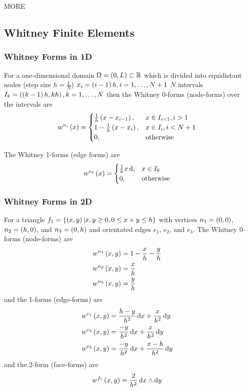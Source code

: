 MORE

\subsection{Whitney Finite Elements}

\subsubsection{Whitney Forms in 1D}

For a one-dimensional domain $\Omega=\pbrac{0,L}\subset\rntopology{}$ which is
divided into equidistant nodes (step size $h=\frac{L}{N}$)
$x_{i}=\left( i-1 \right)h, i=1,\ldots,N+1$ \ie $N$ intervals
$I_{k}=\left( \left( k-1 \right)h,kh \right), k=1,\ldots,N$ then the Whitney 0-forms
(node-forms) over the intervals are
\begin{equation}
   w^{n_{i}}\left( x \right)  = \begin{cases}
    \frac{1}{h}\left( x-x_{i-1} \right), & x\in I_{i=1}, i>1 \\
    1-\frac{1}{h}\left( x-x_{i} \right), & x\in I_{i},i<N+1 \\
    0, & \text{otherwise}
  \end{cases}
\end{equation}

The Whitney 1-forms (edge forms) are
\begin{equation}
   w^{e_{k}}\left( x \right)  = \begin{cases}
    \frac{1}{h} x\,  { \mathrm{d} },    & x\in I_{k} \\
    0, & \text{otherwise}
  \end{cases}
\end{equation}

\subsubsection{Whitney Forms in 2D}

For a triangle $f_{1}=\left\{ \left( x,y \right)\vert x,y\ge 0, 0\leq x+y \leq h \right\}$
with vertices $n_{1}=\left( 0,0 \right)$, $n_{2}=\left( h,0 \right)$, and
$n_{3}=\left( 0,h \right)$ and orientated edges $e_{1}$, $e_{2}$, and $e_{3}$. The
Whitney 0-forms (node-forms) are
\begin{align}
   w^{n_{1}}\left( x,y \right)  &= 1-\frac{x}{h}-\frac{y}{h} \\
   w^{n_{2}}\left( x,y \right)  &= \frac{x}{h} \\
   w^{n_{3}}\left( x,y \right)  &= \frac{y}{h}  
\end{align}
and the 1-forms (edge-forms) are
\begin{align}
   w^{e_{1}}\left( x,y \right) &= \frac{h-y}{h^{2}}\,  { \mathrm{d} }x   + \frac{x}{h^{2}}\,  { \mathrm{d} }y   \\
   w^{e_{2}}\left( x,y \right) &= \frac{-y}{h^{2}}\,  { \mathrm{d} }x   + \frac{x}{h^{2}}\,  { \mathrm{d} }y   \\
   w^{e_{3}}\left( x,y \right) &= \frac{-y}{h^{2}}\,  { \mathrm{d} }x   + \frac{x-h}{h^{2}}\,  { \mathrm{d} }y   
\end{align}
and the 2-form (face-forms) are
\begin{equation}
   w^{f_{1}}\left( x,y \right) = \frac{2}{h^{2}}\,   { \mathrm{d} }x   \wedge   {\ensuremath{ \mathrm{d} }}y    
\end{equation}

